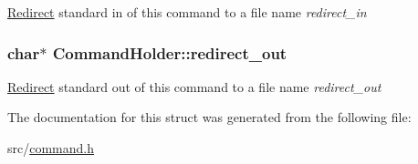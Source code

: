 \hyperlink{structRedirect}{Redirect} standard in of this command to a file name {\itshape redirect\-\_\-in} \hypertarget{structCommandHolder_ac7bfc3e78a8e8b511e2b324c45a17d6f}{
\subsubsection[{redirect\-\_\-out}]{\setlength{\rightskip}{0pt plus 5cm}char$\ast$ Command\-Holder\-::redirect\-\_\-out}}\label{structCommandHolder_ac7bfc3e78a8e8b511e2b324c45a17d6f}
\hyperlink{structRedirect}{Redirect} standard out of this command to a file name {\itshape redirect\-\_\-out} 

The documentation for this struct was generated from the following file\-:\begin{DoxyCompactItemize}
\item 
src/\hyperlink{command_8h}{command.\-h}\end{DoxyCompactItemize}
